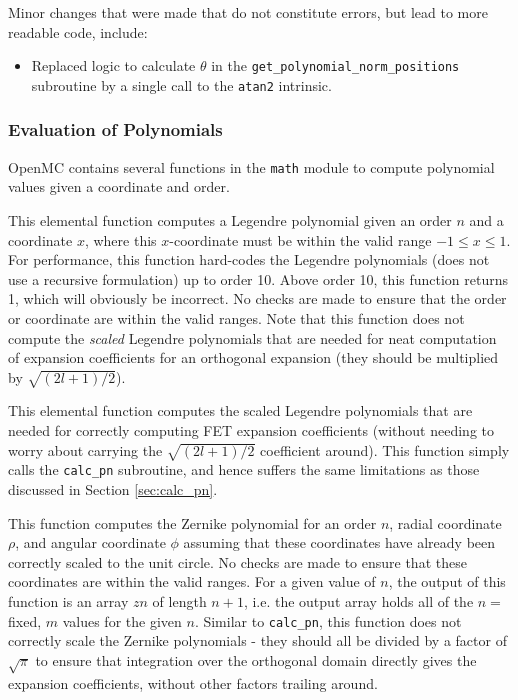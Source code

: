 \documentclass[10pt]{article}
\newcounter{subsubsubsection}[subsubsection]
\numberwithin{equation}{section} %
\begin{document}
Minor changes that were made that do not constitute errors, but lead to more readable code, include:

\begin{itemize}
\item Replaced logic to calculate \(\theta\) in the {\tt get\_polynomial\_norm\_positions} subroutine by a single call to the {\tt atan2} intrinsic.
\end{itemize}

\subsubsection{Evaluation of Polynomials}
OpenMC contains several functions in the {\tt math} module to compute polynomial values given a coordinate and order. 

\label{sec:calc_pn}
This elemental function computes a Legendre polynomial given an order \(n\) and a coordinate \(x\), where this \(x\)-coordinate must be within the valid range \(-1\leq x\leq1\). For performance, this function hard-codes the Legendre polynomials (does not use a recursive formulation) up to order 10. Above order 10, this function returns 1, which will obviously be incorrect. No checks are made to ensure that the order or coordinate are within the valid ranges. Note that this function does not compute the {\it scaled} Legendre polynomials that are needed for neat computation of expansion coefficients for an orthogonal expansion (they should be multiplied by \(\sqrt{(2l+1)/2}\)). 

This elemental function computes the scaled Legendre polynomials that are needed for correctly computing FET expansion coefficients (without needing to worry about carrying the \(\sqrt{(2l+1)/2}\) coefficient around). This function simply calls the {\tt calc\_pn} subroutine, and hence suffers the same limitations as those discussed in Section \ref{sec:calc_pn}. 

\label{sec:calc_zn}
This function computes the Zernike polynomial for an order \(n\), radial coordinate \(\rho\), and angular coordinate \(\phi\) assuming that these coordinates have already been correctly scaled to the unit circle. No checks are made to ensure that these coordinates are within the valid ranges. For a given value of \(n\), the output of this function is an array \(zn\) of length \(n+1\), i.e. the output array holds all of the \(n=\) fixed, \(m\) values for the given \(n\). Similar to {\tt calc\_pn}, this function does not correctly scale the Zernike polynomials - they should all be divided by a factor of \(\sqrt{\pi}\) to ensure that integration over the orthogonal domain directly gives the expansion coefficients, without other factors trailing around.
\end{document}
